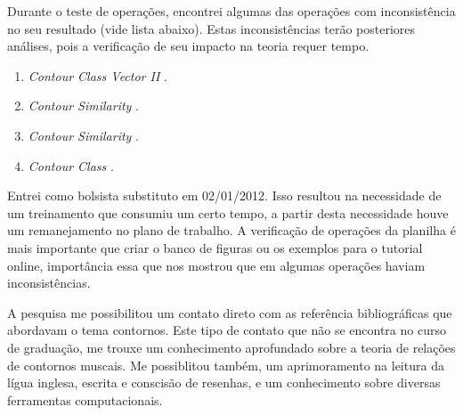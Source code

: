 \documentclass[11pt]{article}
\newcommand{\eng}[1]{\textit{#1}}
\begin{document}
Durante o teste de operações, encontrei algumas das operações com
inconsistência no seu resultado (vide lista abaixo). Estas inconsistências terão posteriores
análises, pois a verificação de seu impacto na teoria requer tempo.


\begin{enumerate}
\item \eng{Contour Class Vector II} \cite[p. 241]{Friedmann1985}.
\item \eng{Contour Similarity} \cite[p. 242]{Quinn1997}.
\item \eng{Contour Similarity} \cite[p. 262]{Quinn1997}.
\item \eng{Contour Class} \cite[p. 113]{Schultz2008}.
\end{enumerate}

Entrei como bolsista substituto em 02/01/2012. Isso resultou na
necessidade de um treinamento que consumiu um certo tempo, a partir
desta necessidade houve um remanejamento no plano de trabalho. A
verificação de operações da planilha é mais importante que criar o
banco de figuras ou os exemplos para o tutorial online, importância
essa que nos mostrou que em algumas operações haviam inconsistências.

A pesquisa me possibilitou um contato direto com as referência bibliográficas que abordavam
o tema contornos. Este tipo de contato que não se encontra no curso de graduação,
me trouxe um conhecimento aprofundado sobre a teoria de relações de contornos muscais.
Me possiblitou também, um aprimoramento na leitura da lígua inglesa, escrita e conscisão
de resenhas, e um conhecimento sobre diversas ferramentas computacionais.



\renewcommand{\refname}{Referências bibliográficas (máximo 15)}

\nocite{
  Friedmann1985,
  Friedmann1987,
  Morris1987,
  Marvin1987,
  Marvin1988,
  Polansky1992,
  Morris1993,
  Clifford1995,
  Quinn1997,
  Beard2003,
  Sampaio2008,
  Schultz2008,
  Schultz2009,
  Bor2009
}





\end{document}
